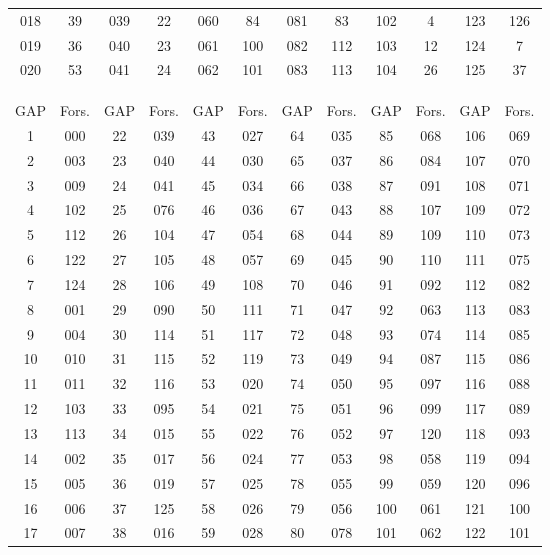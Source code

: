 \documentclass{article}
\theoremstyle{plain}
\theoremstyle{definition}
\begin{document}
\begin{table}[h!]
\begin{center}
\begin{tabular}{cc|cc|cc|cc|cc|cc}
018 & 39 & 039 & 22 & 060 & 84  & 081 & 83  & 102 & 4   & 123 & 126 \\
019 & 36 & 040 & 23 & 061 & 100 & 082 & 112 & 103 & 12  & 124 & 7   \\
020 & 53 & 041 & 24 & 062 & 101 & 083 & 113 & 104 & 26  & 125 & 37 \\
\\
\\
\\
GAP & Fors. & GAP & Fors.  & GAP & Fors.  & GAP & Fors. & GAP & Fors.  & GAP & Fors.  \\
\hline
1   & 000      & 22  & 039  & 43  & 027  & 64  & 035 & 85  & 068  & 106 & 069  \\
2   & 003      & 23  & 040  & 44  & 030  & 65  & 037 & 86  & 084  & 107 & 070  \\
3   & 009      & 24  & 041  & 45  & 034  & 66  & 038 & 87  & 091  & 108 & 071  \\
4   & 102      & 25  & 076  & 46  & 036  & 67  & 043 & 88  & 107  & 109 & 072  \\
5   & 112      & 26  & 104  & 47  & 054  & 68  & 044 & 89  & 109  & 110 & 073  \\
6   & 122      & 27  & 105  & 48  & 057  & 69  & 045 & 90  & 110  & 111 & 075  \\
7   & 124      & 28  & 106  & 49  & 108  & 70  & 046 & 91  & 092  & 112 & 082  \\
8   & 001      & 29  & 090  & 50  & 111  & 71  & 047 & 92  & 063  & 113 & 083  \\
9   & 004      & 30  & 114  & 51  & 117  & 72  & 048 & 93  & 074  & 114 & 085  \\
10  & 010      & 31  & 115  & 52  & 119  & 73  & 049 & 94  & 087  & 115 & 086  \\
11  & 011      & 32  & 116  & 53  & 020  & 74  & 050 & 95  & 097  & 116 & 088  \\
12  & 103      & 33  & 095  & 54  & 021  & 75  & 051 & 96  & 099  & 117 & 089  \\
13  & 113      & 34  & 015  & 55  & 022  & 76  & 052 & 97  & 120  & 118 & 093  \\
14  & 002      & 35  & 017  & 56  & 024  & 77  & 053 & 98  & 058  & 119 & 094  \\
15  & 005      & 36  & 019  & 57  & 025  & 78  & 055 & 99  & 059  & 120 & 096  \\
16  & 006      & 37  & 125  & 58  & 026  & 79  & 056 & 100 & 061  & 121 & 100 \\
17  & 007      & 38  & 016  & 59  & 028  & 80  & 078 & 101 & 062  & 122 & 101 \\

\end{tabular}
\end{center}
\end{table}
\end{document}
